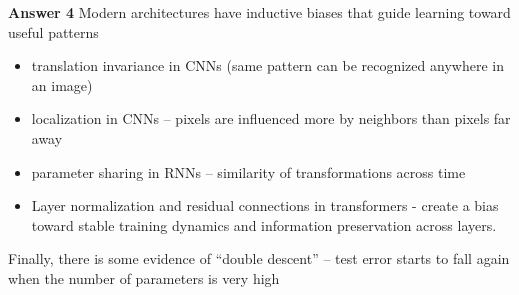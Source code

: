 \begin{frame}
    
    \textbf{Answer 4} Modern architectures have inductive biases that guide
    learning toward useful patterns

    \begin{itemize}
        \item translation invariance in CNNs (same pattern can be
            recognized anywhere in an image)
        \item localization in CNNs -- pixels are influenced more by neighbors
            than pixels far away
        \item parameter sharing in RNNs -- similarity of transformations across
            time
        \item Layer normalization and residual connections in transformers -
            create a bias toward stable training dynamics and information preservation across layers.
    \end{itemize}
    
\end{frame}


\begin{frame}
    
    Finally, there is some evidence of ``double descent'' -- test error starts to fall again
    when the number of parameters is very high

\end{frame}


